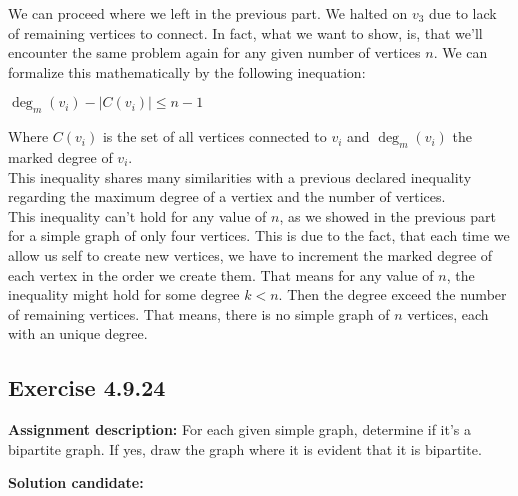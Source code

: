 \documentclass{report}
\newcommand{\cent}[1]{\begin{center}#1\end{center}}
\newcommand{\AssignmentDescription}{\textbf{Assignment description: }}
\newcommand{\Solution}{\textbf{Solution candidate: }}
\newcommand{\Exercise}[1]{\subsection{Exercise #1}}
\newcommand{\defaultEnumerateLabel}{\textbf{\alph*.}}
\begin{document}
\begin{enumerate}[label=\defaultEnumerateLabel]
		We can proceed where we left in the previous part. We halted on $v_3$ due to lack of remaining vertices to connect. In fact, what we want to show, is, that we'll encounter the same problem again for any given number of vertices $n$. We can formalize this mathematically by the following inequation:
		
		\cent{$\deg_m(v_i) - | C(v_i)| \leq n -1$}
		
		Where $C(v_i)$ is the set of all vertices connected to $v_i$ and $\deg_m(v_i)$ the marked degree of $v_i$.\\
		
		This inequality shares many similarities with a previous declared inequality regarding the maximum degree of a vertiex and the number of vertices.\\
		
		This inequality can't hold for any value of $n$, as we showed in the previous part for a simple graph of only four vertices. This is due to the fact, that each time we allow us self to create new vertices, we have to increment the marked degree of each vertex in the order we create them. That means for any value of $n$, the inequality might hold for some degree $k < n$. Then the degree exceed the number of remaining vertices. That means, there is no simple graph of $n$ vertices, each with an unique degree.
		
	\end{enumerate}
	
	\Exercise{4.9.24}
	
	\AssignmentDescription
	For each given simple graph, determine if it's a bipartite graph. If yes, draw the graph where it is evident that it is bipartite.
	
	\Solution
	
\end{document}
